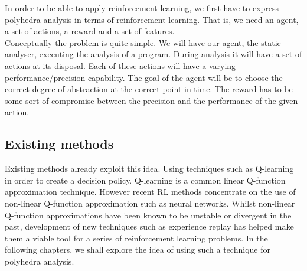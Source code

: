 In order to be able to apply reinforcement learning, we first have to express polyhedra analysis in terms of reinforcement learning. That is, we need an agent, a set of actions, a reward and a set of features.\\
Conceptually the problem is quite simple. We will have our agent, the static analyser, executing the analysis of a program. During analysis it will have a set of actions at its disposal. Each of these actions will have a varying performance/precision capability. The goal of the agent will be to choose the correct degree of abstraction at the correct point in time. The reward has to be some sort of compromise between the precision and the performance of the given action.

\subsection{Existing methods}
Existing methods already exploit this idea. Using techniques such as Q-learning in order to create a decision policy. Q-learning is a common linear Q-function approximation technique. However recent RL methods concentrate on the use of non-linear Q-function approximation such as neural networks. Whilst non-linear Q-function approximations have been known to be unstable or divergent in the past, development of new techniques such as experience replay has helped make them a viable tool for a series of reinforcement learning problems. In the following chapters, we shall explore the idea of using such a technique for polyhedra analysis.